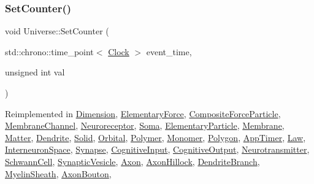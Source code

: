 \subsubsection{\texorpdfstring{Set\+Counter()}{SetCounter()}}
{\footnotesize\ttfamily void Universe\+::\+Set\+Counter (\begin{DoxyParamCaption}\item[{std\+::chrono\+::time\+\_\+point$<$ \mbox{\hyperlink{universe_8h_a0ef8d951d1ca5ab3cfaf7ab4c7a6fd80}{Clock}} $>$}]{event\+\_\+time,  }\item[{unsigned int}]{val }\end{DoxyParamCaption})\hspace{0.3cm}{\ttfamily [virtual]}}



Reimplemented in \mbox{\hyperlink{classDimension_a75c6a1a1e09c40b5860dc11a83384d9f}{Dimension}}, \mbox{\hyperlink{classElementaryForce_a3762cf66ed266b310446417215dec3fa}{Elementary\+Force}}, \mbox{\hyperlink{classCompositeForceParticle_a41cee6bd5a75fbf67fa6e76a9e7d7605}{Composite\+Force\+Particle}}, \mbox{\hyperlink{classMembraneChannel_a61931feff8f3bb485eeb5c80125bb732}{Membrane\+Channel}}, \mbox{\hyperlink{classNeuroreceptor_a0660a316ef44cf723509f720acd16f24}{Neuroreceptor}}, \mbox{\hyperlink{classSoma_a9ef49d3fea8c0fbe6513f3910339f736}{Soma}}, \mbox{\hyperlink{classElementaryParticle_a141316fd968cce8ecc5aa11ce0757d63}{Elementary\+Particle}}, \mbox{\hyperlink{classMembrane_a4bff43b38d7046867f220392a39cc272}{Membrane}}, \mbox{\hyperlink{classMatter_a514b4a64589eb3fbc3db6b3b356bd687}{Matter}}, \mbox{\hyperlink{classDendrite_a7529495515de74fff2b9a92b12531057}{Dendrite}}, \mbox{\hyperlink{classSolid_aea949040518e505ed39b1456a360c5e0}{Solid}}, \mbox{\hyperlink{classOrbital_ae2a2fb06700d1d68501b0cbdea87cc08}{Orbital}}, \mbox{\hyperlink{classPolymer_a1500ffc682396af2f4306c7c7ea7fd87}{Polymer}}, \mbox{\hyperlink{classMonomer_a6f0dfa4382b3d4fa19b7ee0fb8fe7a55}{Monomer}}, \mbox{\hyperlink{classPolygon_ad12083d8c152a1979b04bead93b6b730}{Polygon}}, \mbox{\hyperlink{classAppTimer_a77d5d447d6b136a35304b0571a166ddc}{App\+Timer}}, \mbox{\hyperlink{classLaw_a408c401c8a44870c29ba9d08b45cb40f}{Law}}, \mbox{\hyperlink{classInterneuronSpace_a60a46f22a2e575d65031635a698a60a9}{Interneuron\+Space}}, \mbox{\hyperlink{classSynapse_aa1a990a7b89fbeaf1109a8b70d86111b}{Synapse}}, \mbox{\hyperlink{classCognitiveInput_a4f09c1f176b5406d95a14d7cb1ab75e6}{Cognitive\+Input}}, \mbox{\hyperlink{classCognitiveOutput_a087e8bdab9eb6020dbbe6d47f524c8b6}{Cognitive\+Output}}, \mbox{\hyperlink{classNeurotransmitter_ae16ec051609867d4f64fad5ba4449443}{Neurotransmitter}}, \mbox{\hyperlink{classSchwannCell_a067f87983cb937d5fdb882c267e27921}{Schwann\+Cell}}, \mbox{\hyperlink{classSynapticVesicle_a7fd7cfce5eccb904206d968866f85220}{Synaptic\+Vesicle}}, \mbox{\hyperlink{classAxon_a3493cb97bde26bd66facc6084cd5f219}{Axon}}, \mbox{\hyperlink{classAxonHillock_a0220cee0ad99ddc48496982078c1856c}{Axon\+Hillock}}, \mbox{\hyperlink{classDendriteBranch_a2ce03fbad4a70564eeaafb62debd4d74}{Dendrite\+Branch}}, \mbox{\hyperlink{classMyelinSheath_afb9cd377a71881558f48cf8bb226af77}{Myelin\+Sheath}}, \mbox{\hyperlink{classAxonBouton_afe285478d414f2815afb98abe7b92898}{Axon\+Bouton}}, 